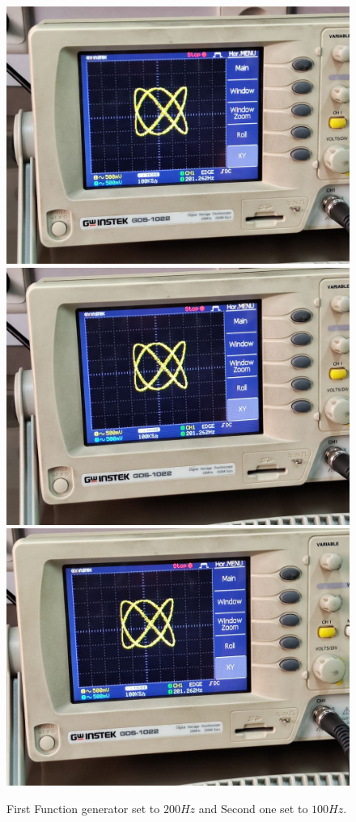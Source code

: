 \documentclass[11pt]{article}
\begin{document}
\begin{question}
{        \begin{figure}[H]
            \begin{center}
                \includegraphics[scale=0.1]{Fig/71.jpeg}
                \includegraphics[scale=0.1]{Fig/72.jpeg}
                \includegraphics[scale=0.1]{Fig/73.jpeg}
                \caption{First Function generator set to $200 Hz$ and Second one set to $100Hz$.}
            \end{center}
        \end{figure}

}
\end{question}
\end{document}

